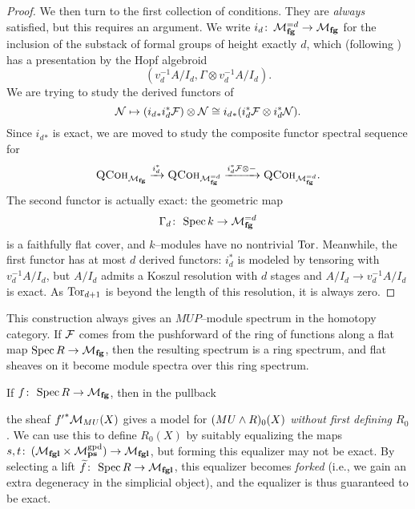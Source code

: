 \begin{proof}
We then turn to the first collection of conditions.  They are \emph{always} satisfied, but this requires an argument.  We write \(i_d\colon\thinspace \mathcal{M}_{\mathbf{fg}}^{= d} \to \mathcal{M}_{\mathbf{fg}}\) for the inclusion of the substack of formal groups of height exactly \(d\), which (following ) has a presentation by the Hopf algebroid \[(v_d^{-1} A / I_d, \Gamma \otimes v_d^{-1} A / I_d).\]  We are trying to study the derived functors of \[\mathcal{N} \mapsto (i_d{}_* i_d^* \mathcal{F}) \otimes \mathcal{N} \cong i_d{}_* (i_d^* \mathcal{F} \otimes i_d^* \mathcal{N}).\]  Since \(i_d{}_*\) is exact, we are moved to study the composite functor spectral sequence for \[\normalfont\textsc{QCoh}_{\mathcal{M}_{\mathbf{fg}}} \xrightarrow{i_d^*} \normalfont\textsc{QCoh}_{\mathcal{M}_{\mathbf{fg}}^{=d}} \xrightarrow{i_d^* \mathcal{F} \otimes -} \normalfont\textsc{QCoh}_{\mathcal{M}_{\mathbf{fg}}^{=d}}.\]  The second functor is actually exact: the geometric map \[\Gamma_d\colon\thinspace \operatorname{Spec} k \to \mathcal{M}_{\mathbf{fg}}^{=d}\] is a faithfully flat cover, and \(k\)--modules have no nontrivial \(\operatorname{Tor}\).  Meanwhile, the first functor has at most \(d\) derived functors: \(i_d^*\) is modeled by tensoring with \(v_d^{-1} A / I_d\), but \(A / I_d\) admits a Koszul resolution with \(d\) stages and \(A / I_d \to v_d^{-1} A / I_d\) is exact.  As \(\operatorname{Tor}_{d+1}\) is beyond the length of this resolution, it is always zero.
\end{proof}

\begin{remark}
This construction always gives an \(MUP\)--module spectrum in the homotopy category.  If \(\mathcal{F}\) comes from the pushforward of the ring of functions along a flat map \(\operatorname{Spec} R \to \mathcal{M}_{\mathbf{fg}}\), then the resulting spectrum is a ring spectrum, and flat sheaves on it become module spectra over this ring spectrum.
\end{remark}

\begin{remark}\label{PullingBackOverMfgVsMfgl}
If \(f\colon\thinspace \operatorname{Spec} R \to \mathcal{M}_{\mathbf{fg}}\), then in the pullback
\begin{center}
\end{center}
the sheaf \({f'}^* \mathcal{M}_{MU}(X)\) gives a model for \((MU \wedge R)_0(X)\) \emph{without first defining \(R_0\)}.  We can use this to define \(R_0(X)\) by suitably equalizing the maps \(s, t\colon\thinspace (\mathcal{M}_{\mathbf{fgl}} \times \mathcal{M}_{\mathbf{ps}}^{\mathrm{gpd}}) \to \mathcal{M}_{\mathbf{fgl}}\), but forming this equalizer may not be exact.  By selecting a lift \(\widetilde f\colon\thinspace \operatorname{Spec} R \to \mathcal{M}_{\mathbf{fgl}}\), this equalizer becomes \emph{forked} (i.e., we gain an extra degeneracy in the simplicial object), and the equalizer is thus guaranteed to be exact.  
\end{remark}

